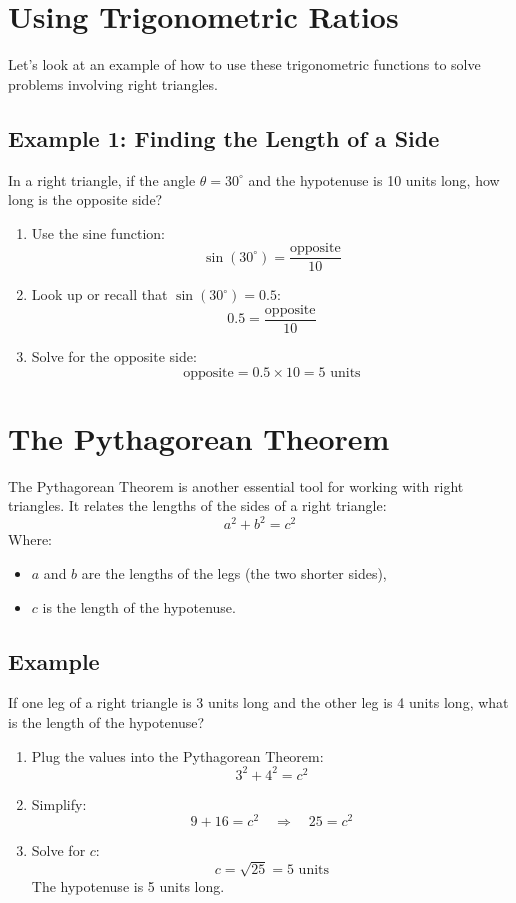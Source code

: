 \section{Using Trigonometric Ratios}
Let’s look at an example of how to use these trigonometric functions to solve problems involving right triangles.

\subsection{Example 1: Finding the Length of a Side}
In a right triangle, if the angle $\theta = 30^\circ$ and the hypotenuse is 10 units long, how long is the opposite side?
\begin{enumerate}
    \item Use the sine function:
    \[
    \sin(30^\circ) = \frac{\text{opposite}}{10}
    \]
    \item Look up or recall that $\sin(30^\circ) = 0.5$:
    \[
    0.5 = \frac{\text{opposite}}{10}
    \]
    \item Solve for the opposite side:
    \[
    \text{opposite} = 0.5 \times 10 = 5 \text{ units}
    \]
\end{enumerate}

\section{The Pythagorean Theorem}
The Pythagorean Theorem is another essential tool for working with right triangles. It relates the lengths of the sides of a right triangle:
\[
a^2 + b^2 = c^2
\]
Where:
\begin{itemize}
    \item $a$ and $b$ are the lengths of the legs (the two shorter sides),
    \item $c$ is the length of the hypotenuse.
\end{itemize}

\subsection{Example}
If one leg of a right triangle is 3 units long and the other leg is 4 units long, what is the length of the hypotenuse?
\begin{enumerate}
    \item Plug the values into the Pythagorean Theorem:
    \[
    3^2 + 4^2 = c^2
    \]
    \item Simplify:
    \[
    9 + 16 = c^2 \quad \Rightarrow \quad 25 = c^2
    \]
    \item Solve for $c$:
    \[
    c = \sqrt{25} = 5 \text{ units}
    \]
    The hypotenuse is 5 units long.
\end{enumerate}

